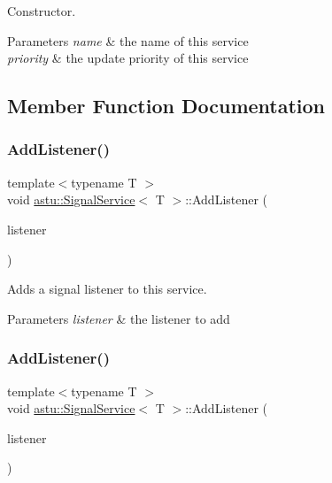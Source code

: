Constructor.


\begin{DoxyParams}{Parameters}
{\em name} & the name of this service \\
\hline
{\em priority} & the update priority of this service \\
\hline
\end{DoxyParams}


\subsection{Member Function Documentation}
\mbox{\label{classastu_1_1SignalService_a9027644028616eb9bad00447648cae29}} 
\subsubsection{\texorpdfstring{Add\+Listener()}{AddListener()}\hspace{0.1cm}{\footnotesize\ttfamily [1/2]}}
{\footnotesize\ttfamily template$<$typename T $>$ \\
void \hyperlink{classastu_1_1SignalService}{astu\+::\+Signal\+Service}$<$ T $>$\+::Add\+Listener (\begin{DoxyParamCaption}\item[{const std\+::shared\+\_\+ptr$<$ \hyperlink{classastu_1_1ISignalListener}{I\+Signal\+Listener}$<$ T $>$$>$ \&}]{listener }\end{DoxyParamCaption})\hspace{0.3cm}{\ttfamily [inline]}}

Adds a signal listener to this service.


\begin{DoxyParams}{Parameters}
{\em listener} & the listener to add \\
\hline
\end{DoxyParams}
\mbox{\label{classastu_1_1SignalService_aaee80c5636b808d9af77b98d23aceccd}} 
\subsubsection{\texorpdfstring{Add\+Listener()}{AddListener()}\hspace{0.1cm}{\footnotesize\ttfamily [2/2]}}
{\footnotesize\ttfamily template$<$typename T $>$ \\
void \hyperlink{classastu_1_1SignalService}{astu\+::\+Signal\+Service}$<$ T $>$\+::Add\+Listener (\begin{DoxyParamCaption}\item[{\hyperlink{classastu_1_1ISignalListener}{I\+Signal\+Listener}$<$ T $>$ \&}]{listener }\end{DoxyParamCaption})\hspace{0.3cm}{\ttfamily [inline]}}


